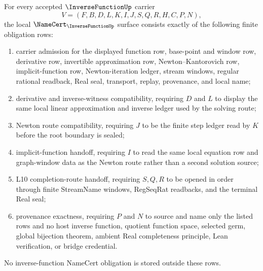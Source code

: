 
\begin{theorem}\label{thm:inverse-function-namecert-obligations}
For every accepted $\InverseFunctionUp$ carrier
$$
V=(F,B,D,L,K,I,J,S,Q,R,H,C,P,N),
$$
the local $\NameCert_{\InverseFunctionUp}$ surface consists exactly of the following finite obligation rows:
\begin{enumerate}
\item carrier admission for the displayed function row, base-point and window row, derivative row, invertible approximation row, Newton--Kantorovich row, implicit-function row, Newton-iteration ledger, stream windows, regular rational readback, Real seal, transport, replay, provenance, and local name;
\item derivative and inverse-witness compatibility, requiring $D$ and $L$ to display the same local linear approximation and inverse ledger used by the solving route;
\item Newton route compatibility, requiring $J$ to be the finite step ledger read by $K$ before the root boundary is sealed;
\item implicit-function handoff, requiring $I$ to read the same local equation row and graph-window data as the Newton route rather than a second solution source;
\item L10 completion-route handoff, requiring $S,Q,R$ to be opened in order through finite StreamName windows, RegSeqRat readbacks, and the terminal Real seal;
\item provenance exactness, requiring $P$ and $N$ to source and name only the listed rows and no host inverse function, quotient function space, selected germ, global bijection theorem, ambient Real completeness principle, Lean verification, or bridge credential.
\end{enumerate}
No inverse-function NameCert obligation is stored outside these rows.
\end{theorem}
